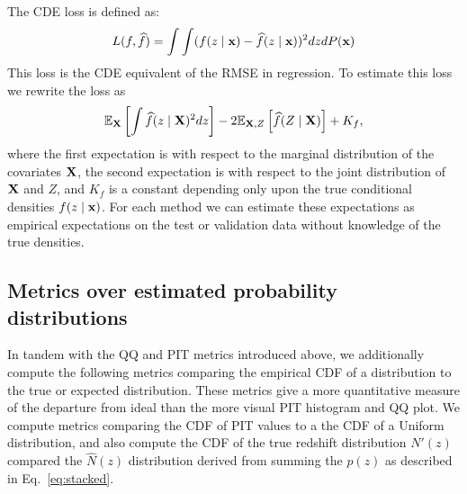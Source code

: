 
The CDE loss is defined as:
\begin{equation} \label{eq:cde-loss}
L(f, \widehat{f}) = \int \int (f(z \mid {\mathbf{x}}) - \widehat{f}(z \mid {\mathbf{x}}))^{2} dz dP({\mathbf{x}})
\end{equation}
This loss is the CDE equivalent of the RMSE in regression. To estimate this loss we rewrite the loss as
\begin{equation} \label{eq:estimated-cde-loss}
\mathbb{E}_{\mathbf{X}} \left[\int \widehat{f}(z \mid {\mathbf{X}})^{2} dz\right] - 2 \mathbb{E}_{{\mathbf{X}},Z}\left[\widehat{f}(Z \mid {\mathbf{X}})\right] + K_{f},
\end{equation}
where the first expectation is with respect to the marginal distribution of the covariates ${\mathbf{X}}$, the second expectation is with respect to the joint distribution of ${\mathbf{X}}$ and $Z$, and $K_{f}$ is a constant depending only upon the true conditional densities $f(z\mid {\mathbf{x}})$.
For each method we can estimate these expectations as empirical expectations on the test or validation data \citep[Eq.~7 in][]{Izbicki:17b} without knowledge of the true densities.


\subsection{Metrics over estimated probability distributions}
\label{sec:quantmet}

In tandem with the QQ and PIT metrics introduced above, we additionally compute the following metrics comparing the empirical CDF of a distribution to the true or expected distribution.  These metrics give a more quantitative measure of the departure from ideal than the more visual PIT histogram and QQ plot.  We compute metrics comparing the CDF of PIT values to a the CDF of a Uniform distribution, and also compute the CDF of the true redshift distribution $N'(z)$ compared the $\hat{N}(z)$ distribution derived from summing the $p(z)$ as described in Eq.~\ref{eq:stacked}.

